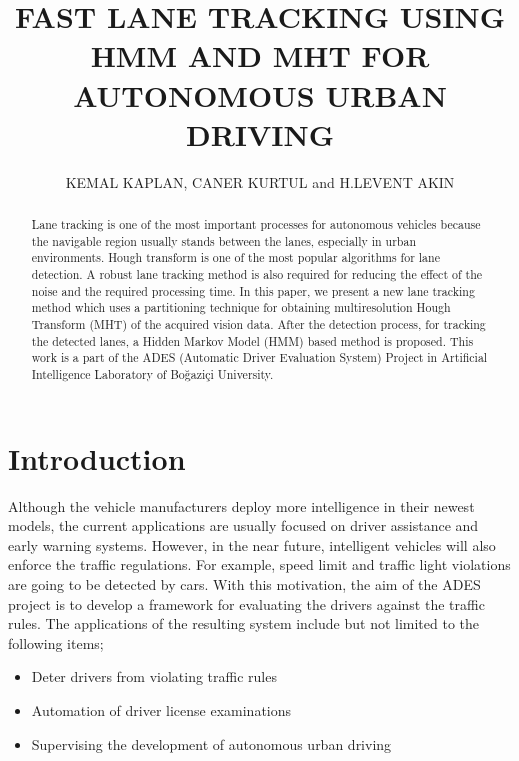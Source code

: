 \documentclass{ws-procs9x6}
\begin{document}
\title{FAST LANE TRACKING USING HMM AND MHT FOR\\
AUTONOMOUS URBAN DRIVING}

\author{KEMAL KAPLAN, CANER KURTUL and H.LEVENT AKIN}

\address{Department of Computer Engineering, Bo{\u g}azi{\c c}i University\\
Istanbul, Turkey}

\begin{abstract}
Lane tracking is one of the most important processes for autonomous vehicles because the navigable region usually stands between the lanes, especially in urban environments. Hough transform is one of the most popular algorithms for lane detection. A robust lane tracking method is also required for reducing the effect of the noise and the required processing time. In this paper, we present a new lane tracking method which uses a partitioning technique for obtaining multiresolution Hough Transform (MHT) of the acquired vision data. After the detection process, for tracking the detected lanes, a Hidden Markov Model (HMM) based method is proposed. This work is a part of the ADES (Automatic Driver Evaluation System) Project in Artificial Intelligence Laboratory of Bo{\u g}azi{\c c}i University.
\end{abstract}

\section{Introduction}

\noindent Although the vehicle manufacturers deploy more intelligence in their newest models, the current applications are usually focused on driver assistance and early warning systems. However, in the near future, intelligent vehicles will also enforce the traffic regulations. For example, speed limit and traffic light violations are going to be detected by cars. With this motivation, the aim of the ADES project is to develop a framework for evaluating the drivers against the traffic rules. The applications of the resulting system include but not limited to the following items;

\begin{itemize}
    \item Deter drivers from violating traffic rules
    \item Automation of driver license examinations
    \item Supervising the development of autonomous urban driving
\end{itemize}
\end{document}
